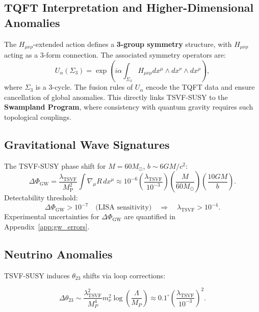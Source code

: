 \documentclass[12pt, onecolumn]{article}
\theoremstyle{definition}
\newcommand{\tsvf}{\lambda_{\mathrm{TSVF}}}
\newcommand{\Mp}{M_{\mathrm{P}}}
\numberwithin{equation}{section}
\begin{document}
\subsection{TQFT Interpretation and Higher-Dimensional Anomalies}
The \(H_{\mu\nu\rho}\)-extended action defines a \textbf{3-group symmetry} structure, with \(H_{\mu\nu\rho}\) acting as a 3-form connection. The associated symmetry operators are:
\begin{equation}
U_\alpha(\Sigma_3) = \exp\left(i \alpha \int_{\Sigma_3} H_{\mu\nu\rho} dx^\mu \wedge dx^\nu \wedge dx^\rho\right),
\end{equation}
where \(\Sigma_3\) is a 3-cycle. The fusion rules of \(U_\alpha\) encode the TQFT data and ensure cancellation of global anomalies. This directly links TSVF-SUSY to the \textbf{Swampland Program}, where consistency with quantum gravity requires such topological couplings.

\subsection{Gravitational Wave Signatures}  
\label{subsec:gw}

The TSVF-SUSY phase shift for \(M = 60M_\odot\), \(b \sim 6GM/c^2\):  
\begin{equation}
\Delta\Phi_{\text{GW}} = \frac{\tsvf}{\Mp^2} \int \nabla_\mu R \, dx^\mu \approx 10^{-6} \left(\frac{\tsvf}{10^{-3}}\right)\left(\frac{M}{60M_\odot}\right)\left(\frac{10GM}{b}\right).
\label{eq:gw_phase}
\end{equation}  
Detectability threshold:  
\begin{equation}
\Delta\Phi_{\text{GW}} > 10^{-7} \quad \text{(LISA sensitivity)} \quad \Rightarrow \quad \tsvf > 10^{-4}.
\end{equation}
Experimental uncertainties for \(\Delta\Phi_{\text{GW}}\) are quantified in Appendix~\ref{app:gw_errors}.

\subsection{Neutrino Anomalies}

TSVF-SUSY induces \( \theta_{23} \) shifts via loop corrections:

\begin{equation}
\Delta \theta_{23} \sim \frac{\tsvf^2}{M_P^4} m_{\nu}^2 \log \left( \frac{\Lambda}{M_P} \right) \approx 0.1^\circ \left( \frac{\tsvf}{10^{-3}} \right)^2.
\end{equation}
\end{document}
